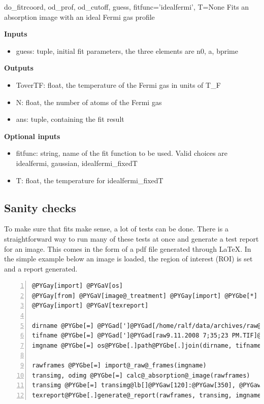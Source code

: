 \documentclass[letterpaper,10pt,english]{manual}
\begin{document}
\hypertarget{fitfermions.do_fit}{}\begin{funcdesc}{do\_fit}{rcoord, od\_prof, od\_cutoff, guess, fitfunc='idealfermi', T=None}
Fits an absorption image with an ideal Fermi gas profile

\textbf{Inputs}
\begin{itemize}
\item {} 
guess: tuple, initial fit parameters, the three elements are n0, a,
bprime

\end{itemize}

\textbf{Outputs}
\begin{itemize}
\item {} 
ToverTF: float, the temperature of the Fermi gas in units of T\_F

\item {} 
N: float, the number of atoms of the Fermi gas

\item {} 
ans: tuple, containing the fit result

\end{itemize}

\textbf{Optional inputs}
\begin{itemize}
\item {} 
fitfunc: string, name of the fit function to be used. Valid choices are
idealfermi, gaussian, idealfermi\_fixedT

\item {} 
T: float, the temperature for idealfermi\_fixedT

\end{itemize}
\end{funcdesc}


\subsection{Sanity checks}

To make sure that fits make sense, a lot of tests can be done. There is a straightforward way to run many of these tests at once and generate a test report for an image. This comes in the form of a pdf file generated through LaTeX. In the simple example below an image is loaded, the region of interest (ROI) is set and a report generated.

\begin{Verbatim}[commandchars=@\[\],numbers=left,firstnumber=1,stepnumber=1]
@PYGay[import] @PYGaV[os]
@PYGay[from] @PYGaV[image@_treatment] @PYGay[import] @PYGbe[*]
@PYGay[import] @PYGaV[texreport]

dirname @PYGbe[=] @PYGad[']@PYGad[/home/ralf/data/archives/raw@_frames/]@PYGad[']
tifname @PYGbe[=] @PYGad[']@PYGad[raw9.11.2008 7;35;23 PM.TIF]@PYGad[']
imgname @PYGbe[=] os@PYGbe[.]path@PYGbe[.]join(dirname, tifname)

rawframes @PYGbe[=] import@_raw@_frames(imgname)
transimg, odimg @PYGbe[=] calc@_absorption@_image(rawframes)
transimg @PYGbe[=] transimg@lb[]@PYGaw[120]:@PYGaw[350], @PYGaw[50]:@PYGaw[275]@rb[] @PYGaD[@# ROI]
texreport@PYGbe[.]generate@_report(rawframes, transimg, imgname)
\end{Verbatim}
\end{document}
